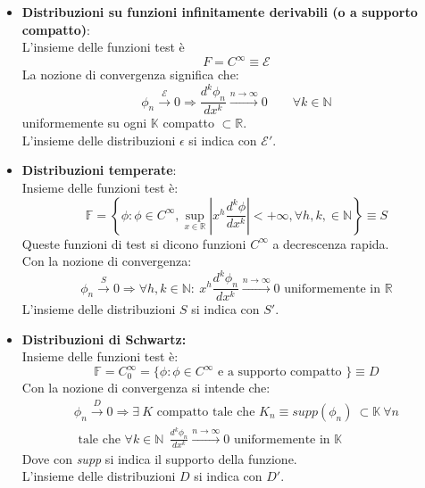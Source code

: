 \documentclass[twoside]{article}
\begin{document}
\begin{itemize}
    \item \textbf{Distribuzioni su funzioni infinitamente derivabili (o a supporto compatto)}:\\
    L'insieme delle funzioni test è
    \begin{equation}
        F=C^\infty\equiv\mathcal{E}
    \end{equation}
    La nozione di convergenza significa che:
    \begin{equation}
        \phi_n \xrightarrow{\mathcal{E}} 0 \Longrightarrow
        \frac{d^k\phi_n}{dx^k} \xrightarrow{n\to\infty} 0 \qquad \forall k\in\mathds{N}
    \end{equation}
    uniformemente su ogni $\mathds{K}$ compatto $\subset\mathds{R}$.\\
    L'insieme delle distribuzioni $\epsilon$ si indica con $\mathcal{E}'$.
    \item \textbf{Distribuzioni temperate}:\\
    Insieme delle funzioni test è:
    \begin{equation}
        \mathds{F}=\left\{\phi:\phi\in C^{\infty}, \sup_{x\in\mathds{R}}\left|x^h\frac{d^k\phi}{dx^k}\right|<+\infty, \forall h,k,\in \mathds{N}\right\}\equiv S
    \end{equation}
    Queste funzioni di test si dicono funzioni $C^\infty$ a decrescenza rapida.\\
    Con la nozione di convergenza:
   \begin{equation}
       \phi_n\xrightarrow{S} 0 \Longrightarrow \forall h,k\in\mathds{N}:\ x^h\frac{d^k\phi_n}{dx^k} \xrightarrow{n\to\infty} 0 \text{ uniformemente in }\mathds{R}
   \end{equation}
   L'insieme delle distribuzioni $S$ si indica con $S'$.
   \item \textbf{Distribuzioni di Schwartz:}\\
    Insieme delle funzioni test è:
    \begin{equation}
        \mathds{F}=C_0^\infty=\{\phi:\phi\in C^{\infty} \text{ e a supporto compatto }\}\equiv D
    \end{equation}
   Con la nozione di convergenza si intende che:
    \begin{equation}\begin{split}
       \phi_n \xrightarrow{D} 0 \Longrightarrow \exists \ K \text{ compatto tale che } K_n\equiv supp(\phi_n) \ \subset \mathds{K} \ \forall n \\ \text{ tale che }\forall k\in \mathds{N} \ \  \frac{d^k\phi_n}{dx^k} \xrightarrow{n\to\infty} 0 \text{ uniformemente in }\mathds{K}
   \end{split}\end{equation}
   Dove con \textit{supp} si indica il supporto della funzione. \\
L'insieme delle distribuzioni $D$ si indica con $D'$.
\end{itemize}
\end{document}
